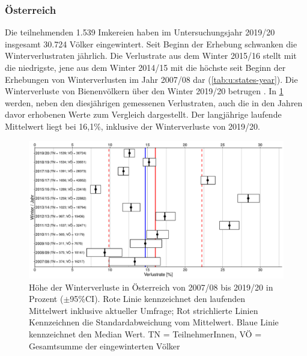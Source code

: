 \subsubsection{Österreich}
\label{ss:austria:U}

Die teilnehmenden 1.539 Imkereien haben im Untersuchungsjahr 2019/20 insgesamt 30.724 Völker eingewintert. Seit Beginn der Erhebung schwanken die Winterverlustraten jährlich. Die Verlustrate aus dem Winter 2015/16 stellt mit  die niedrigste, jene aus dem Winter 2014/15 mit  die höchste seit Beginn der Erhebungen von Winterverlusten im Jahr 2007/08 dar (\cref{tab:u:states-year}). Die Winterverluste von Bienenvölkern über den Winter 2019/20 betrugen . In \cref{fig:u:years:losses} werden, neben den diesjährigen gemessenen Verlustraten, auch die in den Jahren davor erhobenen Werte zum Vergleich dargestellt. Der langjährige laufende Mittelwert liegt bei 16,1\%, inklusive der Winterverluste von 2019/20.

\begin{figure}[H]
  \centering
  \includegraphics[keepaspectratio,width=1\textwidth]{project-U-wintersterblichkeit/figures/plot_years_losses}
  \caption{Höhe der Winterverluste in Österreich von 2007/08 bis 2019/20 in Prozent ($\pm$95\%CI). Rote Linie kennzeichnet den laufenden Mittelwert inklusive aktueller Umfrage; Rot strichlierte Linien Kennzeichnen die Standardabweichung vom Mittelwert. Blaue Linie kennzeichnet den Median Wert. TN = TeilnehmerInnen, VÖ = Gesamtsumme der eingewinterten Völker}
  \label{fig:u:years:losses}
\end{figure}
\newpage
{}

